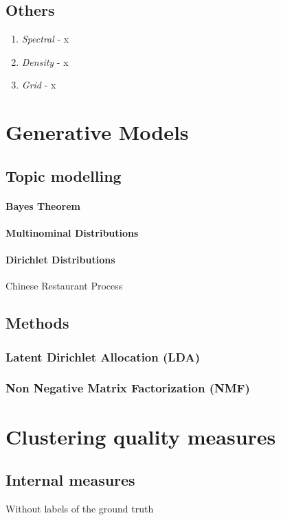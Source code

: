     \subsection{Others}
      \begin{enumerate}
        \item \emph{Spectral} - x
        \item \emph{Density} - x
        \item \emph{Grid} - x
      \end{enumerate}


\section{Generative Models}    
  
  \subsection{Topic modelling}
    \paragraph{Bayes Theorem}
    \paragraph{Multinominal Distributions}
    \paragraph{Dirichlet Distributions}
      Chinese Restaurant Process

  \subsection{Methods}
    \subsubsection{Latent Dirichlet Allocation (LDA)}
    \subsubsection{Non Negative Matrix Factorization (NMF)}


\section{Clustering quality measures}

  \subsection{Internal measures}
    Without labels of the ground truth

